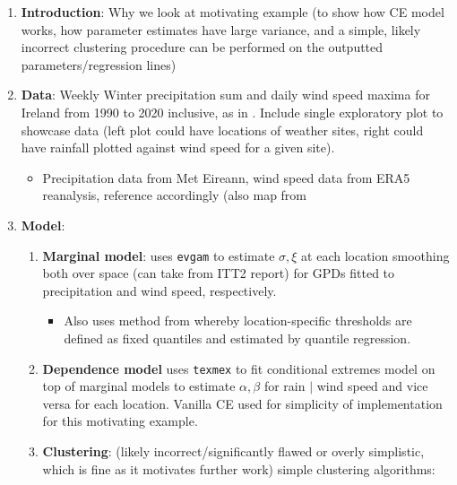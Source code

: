 \documentclass{article}
\numberwithin{equation}{section}
\begin{document}
\begin{enumerate}
  \item \textbf{Introduction}: Why we look at motivating example (to show how CE model works, how parameter estimates have large variance, and a simple, likely incorrect clustering procedure can be performed on the outputted parameters/regression lines) 
  \item \textbf{Data}: Weekly Winter precipitation sum and daily wind speed maxima for Ireland from 1990 to 2020 inclusive, 
    as in \cite{Vignotto2021}. Include single exploratory plot to showcase data (left plot could have locations of weather sites, right could have rainfall plotted against wind speed for a given site).
  \begin{itemize}
    \item Precipitation data from Met Eireann, wind speed data from ERA5 reanalysis, reference accordingly (also map from 
  \end{itemize}
  \item \textbf{Model}:
    \begin{enumerate}
      \item \textbf{Marginal model}: uses \texttt{evgam} to estimate $\sigma, \xi$ at each location smoothing both over space (can take from ITT2 report) for GPDs fitted to precipitation and wind speed, respectively.
      \begin{itemize}
        \item Also uses method from \cite{Youngman2019} whereby location-specific thresholds are defined as fixed quantiles and estimated by quantile regression.
      \end{itemize}
      \item \textbf{Dependence model} uses \texttt{texmex} to fit conditional extremes model on top of marginal models to estimate $\alpha, \beta$ for rain $\mid$ wind speed and vice versa for each location. 
        Vanilla CE used for simplicity of implementation for this motivating example. 
      \item \textbf{Clustering}: (likely incorrect/significantly flawed or overly simplistic, which is fine as it motivates further work) simple clustering algorithms:
        \begin{itemize}

\end{itemize}
\end{enumerate}
\end{enumerate}
\end{document}
